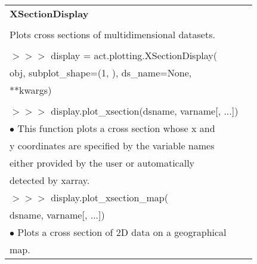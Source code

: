 \documentclass[potrait, z1paper, fontscale=0.33]{baposter} %
\begin{document}
\begin{poster}
{\begin{flushleft}
\begin{tabular}{@{}ll@{}}
\\
\multicolumn{2}{l}{\cellcolor[HTML]{DDFFFF}\bf XSectionDisplay} \\
\\
Plots cross sections of multidimensional datasets.\\
\\
$>$$>$$>$ display = act.plotting.XSectionDisplay(\\
\-\hspace{1.2cm} obj, subplot\_shape=(1, ), ds\_name=None,\\
\-\hspace{1.2cm} **kwargs)\\
\\
$>$$>$$>$ display.plot\_xsection(dsname, varname[, ...])\\
\-\hspace{0.2cm} $\bullet$ This function plots a cross section whose x and\\
\-\hspace{0.5cm} y coordinates are specified by the variable names\\
\-\hspace{0.5cm} either provided by the user or automatically\\
\-\hspace{0.5cm} detected by xarray.\\
$>$$>$$>$ display.plot\_xsection\_map(\\
\-\hspace{1.2cm} dsname, varname[, ...])\\
\-\hspace{0.2cm} $\bullet$ Plots a cross section of 2D data on a geographical\\
\-\hspace{0.5cm} map.\\
\end{tabular}

\end{flushleft}

}



\end{poster}
\end{document}
